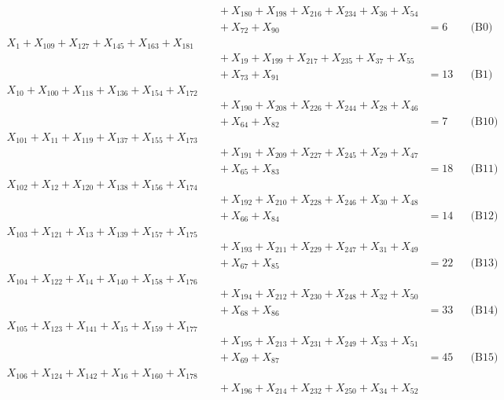 \documentclass[a4paper,10pt]{article}
\begin{document}
{\begin{align}
&\quad  + X_{180} + X_{198} + X_{216} + X_{234} + X_{36} + X_{54} \\[0.5ex]
&\quad  + X_{72} + X_{90} &= 6 && \text{(B0)} \\
X_{1} + X_{109} + X_{127} + X_{145} + X_{163} + X_{181} \\[0.5ex]
&\quad  + X_{19} + X_{199} + X_{217} + X_{235} + X_{37} + X_{55} \\[0.5ex]
&\quad  + X_{73} + X_{91} &= 13 && \text{(B1)} \\
X_{10} + X_{100} + X_{118} + X_{136} + X_{154} + X_{172} \\[0.5ex]
&\quad  + X_{190} + X_{208} + X_{226} + X_{244} + X_{28} + X_{46} \\[0.5ex]
&\quad  + X_{64} + X_{82} &= 7 && \text{(B10)} \\
X_{101} + X_{11} + X_{119} + X_{137} + X_{155} + X_{173} \\[0.5ex]
&\quad  + X_{191} + X_{209} + X_{227} + X_{245} + X_{29} + X_{47} \\[0.5ex]
&\quad  + X_{65} + X_{83} &= 18 && \text{(B11)} \\
X_{102} + X_{12} + X_{120} + X_{138} + X_{156} + X_{174} \\[0.5ex]
&\quad  + X_{192} + X_{210} + X_{228} + X_{246} + X_{30} + X_{48} \\[0.5ex]
&\quad  + X_{66} + X_{84} &= 14 && \text{(B12)} \\
X_{103} + X_{121} + X_{13} + X_{139} + X_{157} + X_{175} \\[0.5ex]
&\quad  + X_{193} + X_{211} + X_{229} + X_{247} + X_{31} + X_{49} \\[0.5ex]
&\quad  + X_{67} + X_{85} &= 22 && \text{(B13)} \\
\allowbreak
X_{104} + X_{122} + X_{14} + X_{140} + X_{158} + X_{176} \\[0.5ex]
&\quad  + X_{194} + X_{212} + X_{230} + X_{248} + X_{32} + X_{50} \\[0.5ex]
&\quad  + X_{68} + X_{86} &= 33 && \text{(B14)} \\
X_{105} + X_{123} + X_{141} + X_{15} + X_{159} + X_{177} \\[0.5ex]
&\quad  + X_{195} + X_{213} + X_{231} + X_{249} + X_{33} + X_{51} \\[0.5ex]
&\quad  + X_{69} + X_{87} &= 45 && \text{(B15)} \\
X_{106} + X_{124} + X_{142} + X_{16} + X_{160} + X_{178} \\[0.5ex]
&\quad  + X_{196} + X_{214} + X_{232} + X_{250} + X_{34} + X_{52} \\[0.5ex]

\end{align}}
\end{document}
